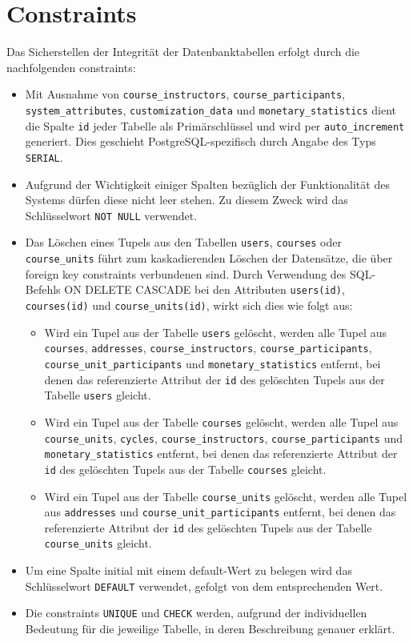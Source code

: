 \section{Constraints}
Das Sicherstellen der Integrität der Datenbanktabellen erfolgt durch die nachfolgenden constraints:

\begin{itemize}
\item Mit Ausnahme von \texttt{course\_instructors}, \texttt{course\_participants}, \texttt{system\_attributes}, \texttt{customization\_data} und \texttt{monetary\_statistics} dient die Spalte \texttt{id} jeder Tabelle als Primärschlüssel und wird per \texttt{auto\_increment} generiert. Dies geschieht PostgreSQL-spezifisch durch Angabe des Typs \texttt{SERIAL}.
\item Aufgrund der Wichtigkeit einiger Spalten bezüglich der Funktionalität des Systems dürfen diese nicht leer stehen. Zu diesem Zweck wird das Schlüsselwort \texttt{NOT NULL} verwendet.
\item Das Löschen eines Tupels aus den Tabellen \texttt{users}, \texttt{courses} oder \texttt{course\_units} führt zum kaskadierenden Löschen der Datensätze, die über foreign key constraints verbundenen sind. Durch Verwendung des SQL-Befehls ON DELETE CASCADE bei den Attributen \texttt{users(id)}, \texttt{courses(id)} und \texttt{course\_units(id)}, wirkt sich dies wie folgt aus:

\begin{itemize}
\item Wird ein Tupel aus der Tabelle \texttt{users} gelöscht, werden alle Tupel aus \texttt{courses}, \texttt{addresses}, \texttt{course\_instructors}, \texttt{course\_participants}, \texttt{course\_unit\_participants} und \texttt{monetary\_statistics} entfernt, bei denen das referenzierte Attribut der \texttt{id} des gelöschten Tupels aus der Tabelle \texttt{users} gleicht.

\item Wird ein Tupel aus der Tabelle \texttt{courses} gelöscht, werden alle Tupel aus \texttt{course\_units}, \texttt{cycles}, \texttt{course\_instructors}, \texttt{course\_participants} und \texttt{monetary\_statistics} entfernt, bei denen das referenzierte Attribut der \texttt{id} des gelöschten Tupels aus der Tabelle \texttt{courses} gleicht.

\item Wird ein Tupel aus der Tabelle \texttt{course\_units} gelöscht, werden alle Tupel aus \texttt{addresses} und \texttt{course\_unit\_participants} entfernt, bei denen das referenzierte Attribut der \texttt{id} des gelöschten Tupels aus der Tabelle \texttt{course\_units} gleicht.
\end{itemize}

\item Um eine Spalte initial mit einem default-Wert zu belegen wird das Schlüsselwort \texttt{DEFAULT} verwendet, gefolgt von dem entsprechenden Wert.

\item Die constraints \texttt{UNIQUE} und \texttt{CHECK} werden, aufgrund der individuellen Bedeutung für die jeweilige Tabelle, in deren Beschreibung genauer erklärt.
\end{itemize}

